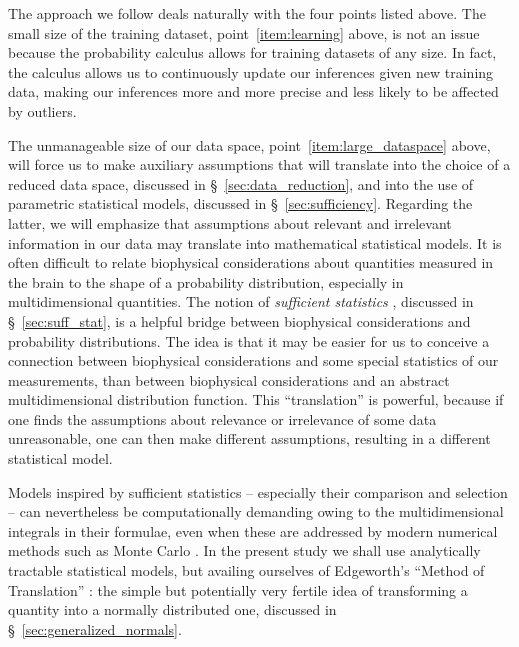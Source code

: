 \documentclass[%
]{frontiersSCNS-nologo} %
\newcommand*{\chap}{ch.} %
\newcommand*{\chaps}{chs} %
\newcommand*{\sect}{\S} %
\renewcommand*{\|}{\mathpunct{|}}%
\begin{document}
The approach we follow deals naturally with the four points listed above.
The small size of the training dataset, point~\ref{item:learning} above, is
not an issue because the probability calculus allows for training datasets
of any size. In fact, the calculus allows us to continuously update our
inferences given new training data, making our inferences more and more
precise and less likely to be affected by outliers.

The unmanageable size of our data space, point~\ref{item:large_dataspace}
above, will force us to make auxiliary assumptions that will translate into
the choice of a reduced data space, discussed in
\sect~\ref{sec:data_reduction}, and into the use
of parametric statistical models, discussed in \sect~\ref{sec:sufficiency}.
Regarding the latter, we will emphasize that assumptions about relevant and
irrelevant information in our data may translate into mathematical
statistical models. It is often difficult to relate biophysical
considerations about quantities measured in the brain to the shape of a
probability distribution, especially in multidimensional quantities. The
notion of \emph{sufficient statistics} \citetext{\citealp{dawid2013};
  \citealp[\chap~4]{bernardoetal1994_r2000};
  \citealp[\sect~5.5]{lindley1965b_r2008};
  \citealp{diaconisetal1981,cifarellietal1982,lauritzen1982_r1988,kallenberg2005}},
discussed in \sect~\ref{sec:suff_stat}, is a helpful bridge between
biophysical considerations and probability distributions. The idea is that
it may be easier for us to conceive a connection between biophysical
considerations and some special statistics of our measurements, than
between biophysical considerations and an abstract multidimensional
distribution function. This \enquote{translation} is powerful, because if
one finds the assumptions about relevance or irrelevance of some data
unreasonable, one can then make different assumptions, resulting in a
different statistical model.

Models inspired by sufficient statistics -- especially their comparison and
selection -- can nevertheless be computationally demanding owing to the
multidimensional integrals in their formulae, even when these are addressed by modern numerical methods such as
Monte Carlo \citetext{\citealp[\chap~IV]{mackay1995_r2003};
  \citealp[\chaps~23--24]{murphy2012}}. In the present study we shall
use analytically tractable statistical models, but availing ourselves of
Edgeworth's \enquote{Method of Translation}
\citetext{\citeyear{edgeworth1898}; \citealp{johnson1949};
  \citealp{mead1965}}: the simple but potentially very fertile idea of
transforming a quantity into a normally distributed one, discussed in
\sect~\ref{sec:generalized_normals}.
\end{document}
